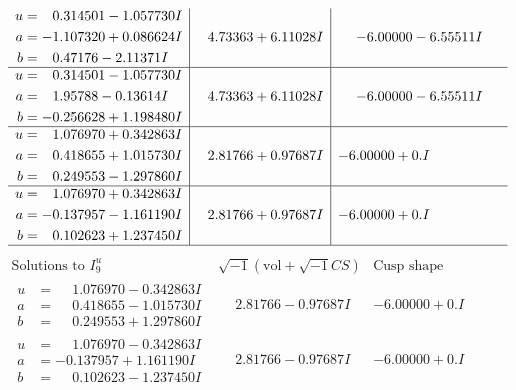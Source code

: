 \documentclass[1p]{elsarticle_modified}
\theoremstyle{definition}
\newcommand{\I}{\sqrt{-1}}
\begin{document}
$$\begin{array}{c|c|c}
\begin{aligned}
u &= \phantom{-}0.314501 - 1.057730 I \\
a &= -1.107320 + 0.086624 I \\
b &= \phantom{-}0.47176 - 2.11371 I\end{aligned}
 & \phantom{-}4.73363 + 6.11028 I & -6.00000 - 6.55511 I \\ \hline\begin{aligned}
u &= \phantom{-}0.314501 - 1.057730 I \\
a &= \phantom{-}1.95788 - 0.13614 I \\
b &= -0.256628 + 1.198480 I\end{aligned}
 & \phantom{-}4.73363 + 6.11028 I & -6.00000 - 6.55511 I \\ \hline\begin{aligned}
u &= \phantom{-}1.076970 + 0.342863 I \\
a &= \phantom{-}0.418655 + 1.015730 I \\
b &= \phantom{-}0.249553 - 1.297860 I\end{aligned}
 & \phantom{-}2.81766 + 0.97687 I & -6.00000 + 0. I\phantom{ +0.000000I} \\ \hline\begin{aligned}
u &= \phantom{-}1.076970 + 0.342863 I \\
a &= -0.137957 - 1.161190 I \\
b &= \phantom{-}0.102623 + 1.237450 I\end{aligned}
 & \phantom{-}2.81766 + 0.97687 I & -6.00000 + 0. I\phantom{ +0.000000I}\\
 \hline 
 \end{array}$$\newpage$$\begin{array}{c|c|c}  
\text{Solutions to }I^u_{9}& \I (\text{vol} + \sqrt{-1}CS) & \text{Cusp shape}\\
 \hline 
\begin{aligned}
u &= \phantom{-}1.076970 - 0.342863 I \\
a &= \phantom{-}0.418655 - 1.015730 I \\
b &= \phantom{-}0.249553 + 1.297860 I\end{aligned}
 & \phantom{-}2.81766 - 0.97687 I & -6.00000 + 0. I\phantom{ +0.000000I} \\ \hline\begin{aligned}
u &= \phantom{-}1.076970 - 0.342863 I \\
a &= -0.137957 + 1.161190 I \\
b &= \phantom{-}0.102623 - 1.237450 I\end{aligned}
 & \phantom{-}2.81766 - 0.97687 I & -6.00000 + 0. I\phantom{ +0.000000I} \\ \hline\begin{aligned}

\end{aligned}
\end{array}$$
\end{document}
